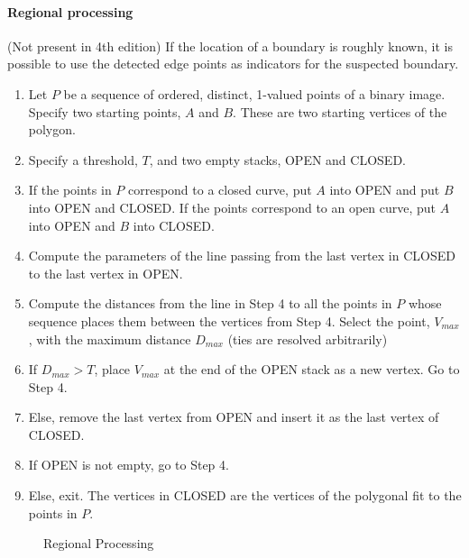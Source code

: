 \paragraph{Regional processing}
(Not present in 4th edition)
If the location of a boundary is roughly known, it is possible to use the detected edge points as indicators for the suspected boundary.
\begin{enumerate}
\item Let $P$ be a sequence of ordered, distinct, 1-valued points of a binary image. Specify two starting points, $A$ and $B$. These are two starting vertices of the polygon.
\item Specify a threshold, $T$, and two empty stacks, OPEN and CLOSED.
\item If the points in $P$ correspond to a closed curve, put $A$ into OPEN and put $B$ into OPEN and CLOSED. If the points correspond to an open curve, put $A$ into OPEN and $B$ into CLOSED.
\item Compute the parameters of the line passing from the last vertex in CLOSED to the last vertex in OPEN.
\item Compute the distances from the line in Step 4 to all the points in $P$ whose sequence places them between the vertices from Step 4. Select the point, $V_{max}$, with the maximum distance $D_{max}$ (ties are resolved arbitrarily)
\item If $D_{max} > T$, place $V_{max}$ at the end of the OPEN stack as a new vertex. Go to Step 4.
\item Else, remove the last vertex from OPEN and insert it as the last vertex of CLOSED.
\item If OPEN is not empty, go to Step 4.
\item Else, exit. The vertices in CLOSED are the vertices of the polygonal fit to the points in $P$.
\end{enumerate}
\begin{figure}[h]
	\centering
	\caption{Regional Processing}
\end{figure}

